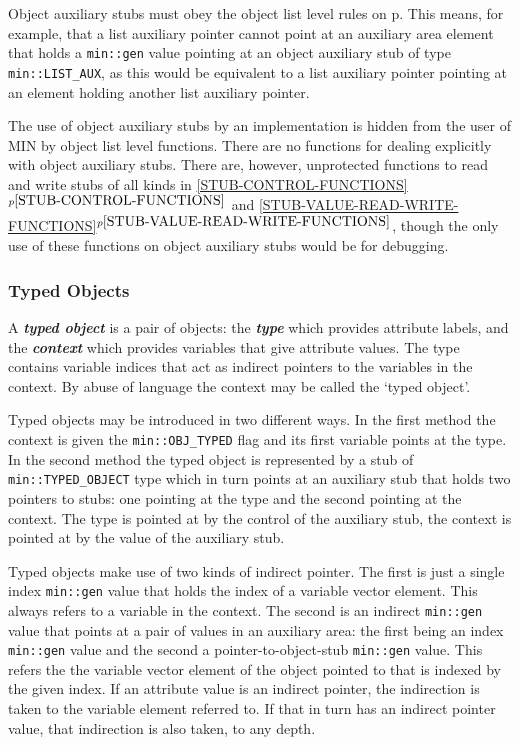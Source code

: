 \documentclass[12pt]{article}
\newcommand{\key}[1]{{\bf \em #1}\index{#1}}
\newcommand{\mkey}[2]{{\bf \em #1}\index{#1!#2}}
\newcommand{\itemref}[1]{\ref{#1}$^{p\pageref{#1}}$}
\newcommand{\pagref}[1]{p\pageref{#1}}
\newcommand{\EOL}{\penalty \exhyphenpenalty}
\begin{document}
Object auxiliary stubs
must obey the object list level rules on \pagref{NO-SUPERFLUOUS-LIST}.
This means, for example, that a list auxiliary pointer cannot point
at an auxiliary area element that holds a \verb|min::gen| value
pointing at an object auxiliary stub of type \verb|min::LIST_AUX|,
as this would be equivalent to a list auxiliary pointer pointing at an
element holding another list auxiliary pointer.

The use of object auxiliary stubs by an implementation is hidden from
the user of MIN by object list level functions.  There are no functions
for dealing explicitly with object auxiliary stubs.  There are, however,
unprotected functions to read and write stubs of all kinds in
\itemref{STUB-CONTROL-FUNCTIONS} and
\itemref{STUB-VALUE-READ-WRITE-FUNCTIONS},
though the only use of these functions on
object auxiliary stubs would be for debugging.

\subsubsection{Typed Objects}
\label{TYPED-OBJECTS}

A \key{typed object} is a pair of objects: the \mkey{type}{of typed object}
which provides attribute labels, and the \mkey{context}{of typed object}
which provides variables that give attribute values.  The type
contains variable indices that act as indirect pointers to the
variables in the context.  By abuse of language the context may be
called the `typed object'.

Typed objects may be introduced in two different ways.  In the first
method the context is given the {\tt min::\EOL OBJ\_\EOL TYPED} flag
and its first variable points at the type.  In the second method
the typed object is represented by a stub of {\tt min::\EOL TYPED\_\EOL OBJECT}
type which in turn points at an auxiliary stub that holds two pointers
to stubs: one pointing at the type and the second pointing at the context.
The type is pointed at by the control of the auxiliary stub, the context
is pointed at by the value of the auxiliary stub.

Typed objects make use of two kinds of indirect pointer.  The first is
just a single index \verb|min::gen| value that holds the index of a
variable vector element.  This always refers to a variable in the context.
The second is an indirect \verb|min::gen| value that points at a pair
of values in an auxiliary area: the first being an index \verb|min::gen|
value and the second a pointer-to-object-stub \verb|min::gen| value.
This refers the the variable vector element of the object pointed to
that is indexed by the given index.  If an attribute value is an indirect
pointer, the indirection is taken to the variable element referred to.
If that in turn has an indirect pointer value, that indirection is also
taken, to any depth.
\end{document}
